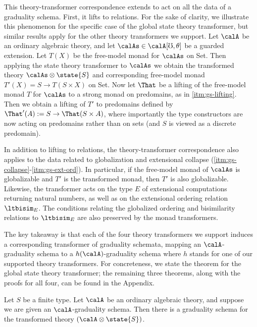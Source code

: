 \documentclass[acmsmall,screen,review,anonymous]{acmart}
\theoremstyle{remark}
\begin{document}
This theory-transformer correspondence extends to act on all the data of a
graduality schema. First, it lifts to relations. For the sake of clarity, we
illustrate this phenomenon for the specific case of the global state theory
transformer, but similar results apply for the other theory transformers we
support.
%
Let $\calA$ be an ordinary algebraic theory, and let $\calAs \in \calA[\mho,
\theta]$ be a guarded extension. Let $T(X)$ be the free-model monad for $\calAs$
on Set. Then applying the state theory transformer to $\calAs$ we obtain the
transformed theory $\calAs \otimes \state{S}$ and corresponding free-model monad
$T'(X) = S \to T(S \times X)$ on Set.
%
Now let $\That$ be a lifting of the free-model monad $T$ for $\calAs$ to a
strong monad on predomains, as in \ref{itm:gs-lifting}. Then we obtain a lifting
of $T'$ to predomains defined by $\That'(A) := S \to \That(S \times A)$, where
importantly the type constructors are now acting on predomains rather than on
sets (and $S$ is viewed as a discrete predomain).


In addition to lifting to relations, the theory-transformer correspondence also
applies to the data related to globalization and extensional collapse
(\ref{itm:gs-collapse}-\ref{itm:gs-ext-ord}). In particular, if the
free-model monad of $\calAs$ is globalizable and $T'$ is the transformed monad,
then $T'$ is also globalizable. Likewise, the transformer acts on the type $E$
of extensional computations returning natural numbers, as well as on the
extensional ordering relation $\ltbisim_E$. The conditions relating the
globalized ordering and bisimilarity relations to $\ltbisim_E$ are also
preserved by the monad transformers.

The key takeaway is that each of the four theory transformers we support induces
a corresponding transformer of graduality schemata, mapping an
$\calA$-graduality schema to a $h(\calA)$-graduality schema where $h$ stands for
one of our supported theory transformers.
%
For concreteness, we state the theorem for the global state theory transformer;
the remaining three theorems, along with the proofs for all four, can be found
in the Appendix.
%
\begin{theorem}\label{thm:gs-global-state}
  Let $S$ be a finite type. Let $\calA$ be an ordinary algebraic theory, and
  suppose we are given an $\calA$-graduality schema. Then there is a graduality
  schema for the transformed theory $(\calA \otimes \state{S})$.
\end{theorem}
\end{document}
